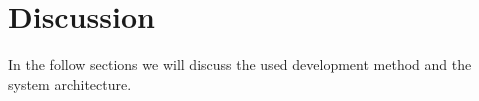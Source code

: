 \chapter{Discussion}
In the follow sections we will discuss the used development method and the system architecture.



